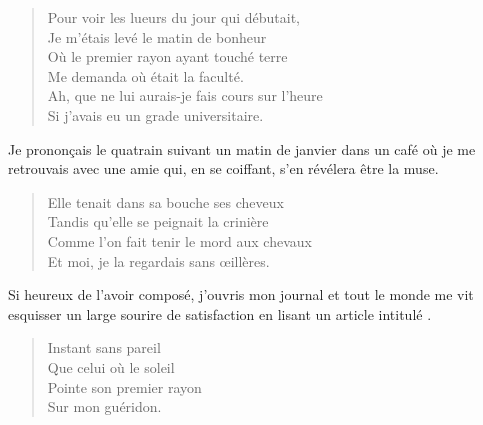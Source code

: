 \begin{verse}%
  \sizain%
  Pour voir les lueurs du jour qui débutait,\\  %
  Je m’étais levé le matin de bonheur\\  %
  Où le premier rayon ayant touché terre\\  %
  Me demanda où était la faculté.\\  %
  Ah, que ne lui aurais-je fais cours sur l’heure\\  %
  Si j’avais eu un grade universitaire.
\end{verse}

\begin{prose}
  Je prononçais le quatrain suivant un matin de janvier dans un café où je me retrouvais avec une amie  qui, en se coiffant, s’en révélera être la muse.
\end{prose}

\begin{verse}%
  \sizain%
  Elle tenait dans sa bouche ses cheveux\\  %
  Tandis qu’elle se peignait la crinière\\  %
  Comme l’on fait tenir le mord aux chevaux\\  %
  Et moi, je la regardais sans œillères.
\end{verse}

\begin{prose}
  Si heureux de l’avoir composé, j’ouvris mon journal et tout le monde me vit esquisser un large sourire de satisfaction en lisant un article intitulé .
\end{prose}

\begin{verse}%
  \sizain%
  Instant sans pareil\\  %
  Que celui où le soleil\\  %
  Pointe son premier rayon\\  %
  Sur mon guéridon.
\end{verse}

